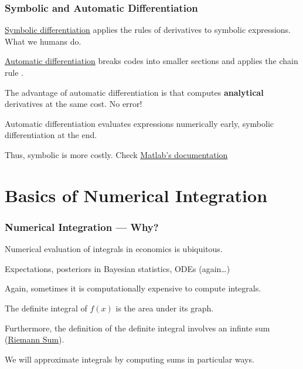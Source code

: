 \documentclass[11pt,xcolor={svgnames},aspectratio=169,usepdftitle=false]{beamer}
\let\toneitemize\itemize
\let\ttwoitemize\enditemize
\renewenvironment{itemize}{\toneitemize\addtolength{\itemsep}{0.7\baselineskip}}{\ttwoitemize}
\begin{document}
\begin{frame}
  \frametitle{Symbolic and Automatic Differentiation}
\begin{itemize}
  \item \href{https://www.mathworks.com/help/symbolic/diff.html\#btwol6i-2}{Symbolic differentiation} applies the rules of derivatives to symbolic expressions. What we humans do.
  \item \href{https://en.wikipedia.org/wiki/Automatic_differentiation}{Automatic differentiation} breaks codes into smaller sections and applies the chain rule \citep[See Chapter~4]{kwon2019julia}.
  \item The advantage of automatic differentiation is that computes \alert{\textbf{analytical}} derivatives at the same cost. No error!
  \item Automatic differentiation evaluates expressions numerically early, symbolic differentiation at the end.
  \item Thus, symbolic is more costly. Check \href{https://www.mathworks.com/help/deeplearning/ug/deep-learning-with-automatic-differentiation-in-matlab.html}{Matlab's documentation}
\end{itemize}
\end{frame}

\section{Basics of Numerical Integration}

\begin{frame}
  \frametitle{Numerical Integration --- Why?}
\begin{itemize}
  \item Numerical evaluation of integrals in economics is ubiquitous.
  \begin{itemize}
    \item Expectations, posteriors in Bayesian statistics, ODEs (again\ldots)
  \end{itemize}
  \item Again, sometimes it is computationally expensive to compute integrals.
  \item The definite integral of $f(x)$ is the area under its graph.
  \item Furthermore, the definition of the definite integral involves an infinte sum (\href{https://en.wikipedia.org/wiki/Riemann_sum}{Riemann Sum}).
  \item We will approximate integrals by computing sums in particular ways.
\end{itemize}
\end{frame}
\end{document}
